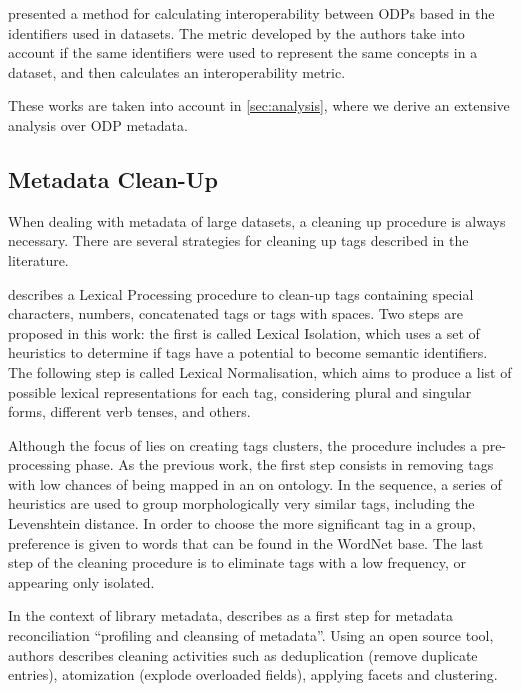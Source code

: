  presented a method for calculating interoperability between ODPs based in the identifiers used in datasets.
The metric developed by the authors take into account if the same identifiers were used to represent the same concepts in a dataset, and then calculates an interoperability metric.

These works are taken into account in \autoref{sec:analysis}, where we derive an extensive analysis over ODP metadata.

\subsection{Metadata Clean-Up}
\label{sec:metadata_cleanup}

When dealing with metadata of large datasets, a cleaning up procedure is always necessary.
There are several strategies for cleaning up tags described in the literature.

 describes a Lexical Processing procedure to clean-up tags containing special characters, numbers, concatenated tags or tags with spaces.
Two steps are proposed in this work: the first is called Lexical Isolation, which uses a set of heuristics to determine if tags have a potential to become semantic identifiers.
The following step is called Lexical Normalisation, which aims to produce a list of possible lexical representations for each tag, considering plural and singular forms, different verb tenses, and others.

Although the focus of  lies on creating tags clusters, the procedure includes a pre-processing phase.
As the previous work, the first step consists in removing tags with low chances of being mapped in an on ontology.
In the sequence, a series of heuristics are used to group morphologically very similar tags, including the Levenshtein distance.
In order to choose the more significant tag in a group, preference is given to words that can be found in the WordNet base.
The last step of the cleaning procedure is to eliminate tags with a low frequency, or appearing only isolated.

In the context of library metadata,  describes as a first step for metadata reconciliation ``profiling and cleansing of metadata''.
Using an open source tool, authors describes cleaning activities such as deduplication (remove duplicate entries), atomization (explode overloaded fields), applying facets and clustering.


